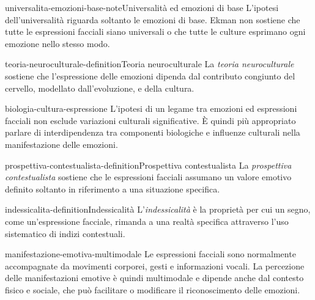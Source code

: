 \documentclass[preview]{standalone}
\begin{document}
\begin{snippetnote}{universalita-emozioni-base-note}{Universalità ed emozioni di base}
    L'ipotesi dell'universalità riguarda soltanto le emozioni di base. Ekman non
    sostiene che tutte le espressioni facciali siano universali o che tutte le
    culture esprimano ogni emozione nello stesso modo.
\end{snippetnote}


\begin{snippetdefinition}{teoria-neuroculturale-definition}{Teoria neuroculturale}
    La \emph{teoria neuroculturale} sostiene che l'espressione delle emozioni
    dipenda dal contributo congiunto del cervello, modellato dall'evoluzione, e
    della cultura.
\end{snippetdefinition}

\begin{snippet}{biologia-cultura-espressione}
    L'ipotesi di un legame tra emozioni ed espressioni facciali non esclude
    variazioni culturali significative. È quindi più appropriato parlare di
    interdipendenza tra componenti biologiche e influenze culturali nella
    manifestazione delle emozioni.
\end{snippet}

\begin{snippetdefinition}{prospettiva-contestualista-definition}{Prospettiva contestualista}
    La \emph{prospettiva contestualista} sostiene che le espressioni facciali
    assumano un valore emotivo definito soltanto in riferimento a una situazione
    specifica.
\end{snippetdefinition}

\begin{snippetdefinition}{indessicalita-definition}{Indessicalità}
    L'\emph{indessicalità} è la proprietà per cui un segno, come un'espressione
    facciale, rimanda a una realtà specifica attraverso l'uso sistematico di
    indizi contestuali.
\end{snippetdefinition}

\begin{snippet}{manifestazione-emotiva-multimodale}
    Le espressioni facciali sono normalmente accompagnate da movimenti corporei,
    gesti e informazioni vocali. La percezione delle manifestazioni emotive è
    quindi multimodale e dipende anche dal contesto fisico e sociale, che può
    facilitare o modificare il riconoscimento delle emozioni.
\end{snippet}
\end{document}
